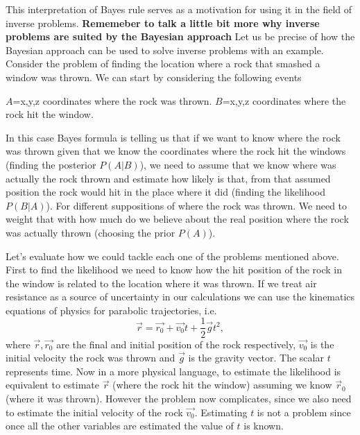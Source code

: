 \documentclass[12pt]{book}
\begin{document}
This interpretation of Bayes rule serves as a motivation for using it in the field of inverse problems. 
\textbf{Rememeber to talk a little bit more why inverse problems are suited by the Bayesian approach}
Let us be precise of how the Bayesian approach can be used to solve inverse problems with an example. 
Consider the problem of finding the location where a rock that smashed a window was thrown. We can
start by considering the following events
\begin{center}
$A$=x,y,z coordinates where the rock was thrown.\newline
$B$=x,y,z coordinates where the rock hit the window.
\end{center}
In this case Bayes formula is telling us that if we want to know where the rock was thrown given that we 
know the coordinates where the rock hit the windows (finding the posterior $P(A|B)$), we need to assume that we know
where was actually the rock thrown and estimate how likely is that, from that assumed position the rock 
would hit in the place where it did (finding the likelihood $P(B|A)$). For different suppositions of where the rock
was thrown. We need to weight that with how much do we  believe about the real position where the rock
 was actually thrown 
(choosing the prior $P(A)$).
\newline



Let's evaluate how we could tackle each one of the problems mentioned above. First to find the likelihood
we need to know how the hit position of the rock  in the window  is related to the location where it was
thrown. If we treat air resistance as a source of uncertainty in our calculations we can use
the kinematics equations of physics for parabolic trajectories, i.e.
\begin{equation}\label{eqnKinematics}
\vec{r}=\vec{r_{0}}+\vec{v_{0}}t+\frac{1}{2}\vec{g}t^{2},
\end{equation} 
where $\vec{r},\vec{r_{0}}$ are the final and initial position of the rock respectively, $\vec{v_{0}}$ is 
the initial velocity the rock was thrown and $\vec{g}$ is the gravity vector. The scalar $t$ represents time.
Now in a more physical language, to estimate the likelihood is equivalent to estimate $\vec{r}$ (where the 
rock hit the window) assuming we know $\vec{r}_{0}$ (where it was thrown). However the problem now complicates, since
we also need to estimate the initial velocity of the rock $\vec{v_{0}}$. Estimating $t$ is not a problem
since once all the other variables are estimated the value of $t$ is known. 
\end{document}
